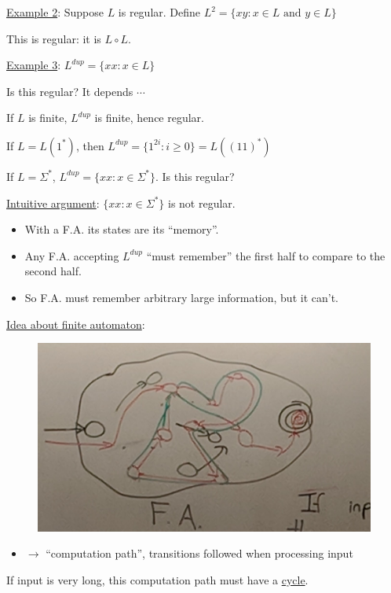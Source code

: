 \documentclass[twoside]{article}
\begin{document}
\underline{Example 2}: Suppose $L$ is regular. Define $L^2 = \{xy: x \in L \text{ and } y \in L\}$

This is regular: it is $L \circ L$.

\underline{Example 3}: $L^{dup} = \{xx: x \in L\}$

Is this regular? It depends $\cdots$

If $L$ is finite, $L^{dup}$ is finite, hence regular.

If $L = L(1^*)$, then $L^{dup} = \{1^{2i}: i \geq 0\} = L((11)^*)$

If $L = \Sigma^*$, $L^{dup} = \{xx: x \in \Sigma^*\}$. Is this regular?

\underline{Intuitive argument}: $\{xx: x \in \Sigma^*\}$ is not regular.

\begin{itemize}
  \item With a F.A. its states are its ``memory''.
  \item Any F.A. accepting $L^{dup}$ ``must remember'' the first half to compare to the second half.
  \item So F.A. must remember arbitrary large information, but it can't.
\end{itemize}

\underline{Idea about finite automaton}:

\begin{figure}[ht]
  \centering
  \includegraphics[scale=0.3]{img1}
\end{figure}

\begin{itemize}
  \item $\rightarrow$ ``computation path'', transitions followed when processing input
\end{itemize}

If input is very long, this computation path must have a \underline{cycle}.
\end{document}
